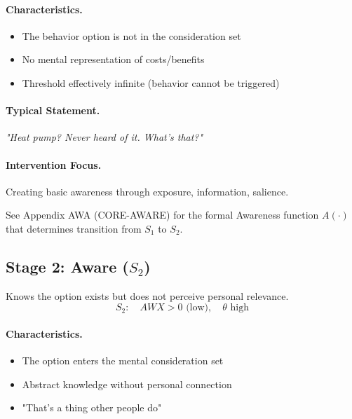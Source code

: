 \paragraph{Characteristics.}
\begin{itemize}
    \item The behavior option is not in the consideration set
    \item No mental representation of costs/benefits
    \item Threshold effectively infinite (behavior cannot be triggered)
\end{itemize}

\paragraph{Typical Statement.}
\textit{"Heat pump? Never heard of it. What's that?"}

\paragraph{Intervention Focus.}
Creating basic awareness through exposure, information, salience.

\begin{cross-reference}
See Appendix AWA (CORE-AWARE) for the formal Awareness function $A(\cdot)$
that determines transition from $S_1$ to $S_2$.
\end{cross-reference}

\subsection{Stage 2: Aware ($S_2$)}
\label{sec:bcj-s2}

\begin{definition}
Knows the option exists but does not perceive personal relevance.
\begin{equation}
S_2: \quad AWX > 0 \text{ (low)}, \quad \theta \text{ high}
\end{equation}
\end{definition}

\paragraph{Characteristics.}
\begin{itemize}
    \item The option enters the mental consideration set
    \item Abstract knowledge without personal connection
    \item "That's a thing other people do"
\end{itemize}

